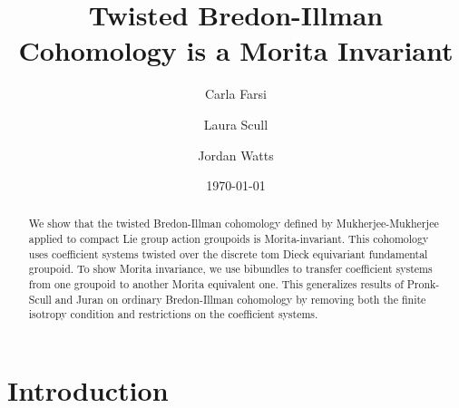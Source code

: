 \documentclass[12pt,reqno]{amsart}
\newcommand{\printname}[1]{}
\renewcommand{\printname}[1]
	{{\color{brown}{\makebox[0pt]{\hspace{-1in}\raisebox{8pt}{\tiny #1}}}}}
\newcommand{\labell}[1]{\label{#1} \printname{#1}}
\theoremstyle{plain}
\theoremstyle{definition}
\begin{document}
	\author{Carla Farsi}
	\address{Department of Mathematics, University of Colorado at Boulder, Boulder, Colorado 80309, USA}

    \author{Laura Scull}
	\address{Department of Mathematics, Fort Lewis College, Durango, Colorado 81301}

	\author{Jordan Watts}
	\address{Department of Mathematics, Central Michigan University, Pearce Hall 214, Mount Pleasant, Michigan 48859, USA}
    
	\title{Twisted Bredon-Illman Cohomology is a Morita Invariant}
	\date{\today}

	\begin{abstract}
We show that the twisted Bredon-Illman cohomology defined by Mukherjee-Mukherjee applied to compact Lie group action groupoids is Morita-invariant.   This cohomology uses coefficient systems twisted over the discrete tom Dieck equivariant fundamental groupoid.    To show Morita  invariance, we use bibundles to transfer coefficient systems from one groupoid to another Morita equivalent one.   This generalizes results of Pronk-Scull and Juran on ordinary Bredon-Illman cohomology by removing both the finite isotropy condition and  restrictions on the coefficient systems.  
 
	\end{abstract}

	\maketitle

    \tableofcontents

	\thispagestyle{empty}

\section{Introduction}\labell{s:intro}
\end{document}
